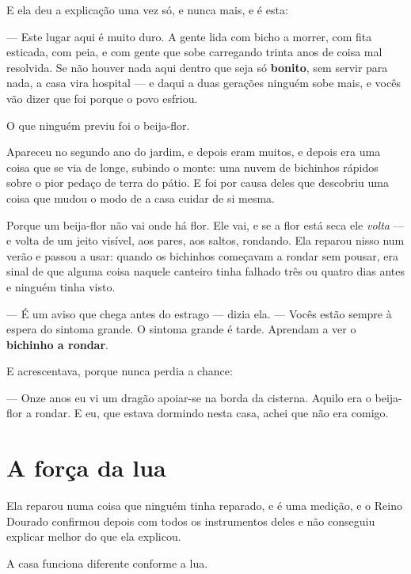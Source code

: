 \documentclass[livro.tex]{subfiles}
\begin{document}
\medskip

E ela deu a explicação uma vez só, e nunca mais, e é esta:

--- Este lugar aqui é muito duro. A gente lida com bicho a morrer, com fita esticada, com peia, e
com gente que sobe carregando trinta anos de coisa mal resolvida. Se não houver nada aqui dentro
que seja só \textbf{bonito}, sem servir para nada, a casa vira hospital --- e daqui a duas
gerações ninguém sobe mais, e vocês vão dizer que foi porque o povo esfriou.

\medskip

O que ninguém previu foi o beija-flor.

Apareceu no segundo ano do jardim, e depois eram muitos, e depois era uma coisa que se via de
longe, subindo o monte: uma nuvem de bichinhos rápidos sobre o pior pedaço de terra do pátio. E
foi por causa deles que \Lua descobriu uma coisa que mudou o modo de a casa cuidar de si mesma.

Porque um beija-flor não vai onde há flor. Ele vai, e se a flor está seca ele \emph{volta} --- e
volta de um jeito visível, aos pares, aos saltos, rondando. Ela reparou nisso num verão e passou
a usar: quando os bichinhos começavam a rondar sem pousar, era sinal de que alguma coisa naquele
canteiro tinha falhado três ou quatro dias antes e ninguém tinha visto.

--- É um aviso que chega antes do estrago --- dizia ela. --- Vocês estão sempre à espera do
sintoma grande. O sintoma grande é tarde. Aprendam a ver o \textbf{bichinho a rondar}.

E acrescentava, porque nunca perdia a chance:

--- Onze anos eu vi um dragão apoiar-se na borda da cisterna. Aquilo era o beija-flor a rondar. E
eu, que estava dormindo nesta casa, achei que não era comigo.

\section{A força da lua}

Ela reparou numa coisa que ninguém tinha reparado, e é uma medição, e o Reino Dourado confirmou
depois com todos os instrumentos deles e não conseguiu explicar melhor do que ela explicou.

\medskip

A casa funciona diferente conforme a lua.
\end{document}
